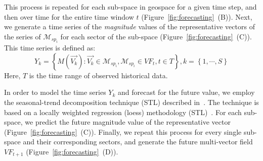 This process is repeated for each sub-space in geospace for a given time step, and then over time for the entire time window $t$ (Figure~\ref{fig:forecasting}~(B)). 
Next, we generate a time series of the \textit{magnitude} values of the representative vectors of the series of $\mathcal{M}_{sp_{i}}$ for each sector of the sub-space (Figure~\ref{fig:forecasting}~(C)).
This time series is defined as:
\begin{equation}
Y_k = \left\{M(\vec{V_k}): \vec{V_k} \in \mathcal{M}_{sp_{i}}, \mathcal{M}_{sp_{i}} \in VF_t, t \in T\right\}, k = \left\{1, \cdots, S\right\}
\end{equation}
Here, $T$ is the time range of observed historical data. %

In order to model the time series $Y_k$ and forecast for the future value, we employ the seasonal-trend decomposition technique (STL) described in~\cite{Maciejewski:2011:Forecasting, Malik:2014:Proactive}. 
The technique is based on a locally weighted regression (loess) methodology (STL)~\cite{Cleveland:1990:SAS}.
For each sub-space, we predict the future magnitude value of the representative vector (Figure~\ref{fig:forecasting}~(C)).
Finally, we repeat this process for every single sub-space and their corresponding sectors, and generate the future multi-vector field $VF_{t+1}$ (Figure~\ref{fig:forecasting}~(D)).




